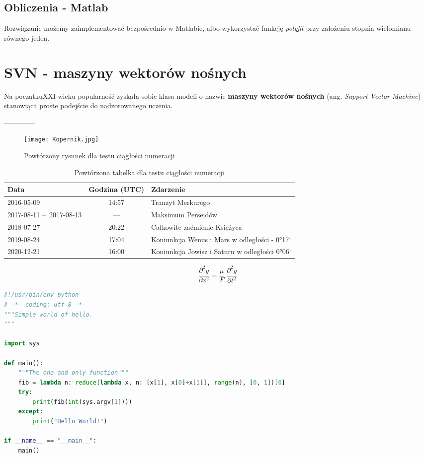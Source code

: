 \section{Obliczenia - Matlab} 
Rozwiązanie \cite{ossowski2023} możemy zaimplementować bezpośrednio w Matlabie, albo wykorzystać funkcję  \textit{ polyfit }  przy założeniu stopnia wielomianu równego jeden.




\chapter{ SVN - maszyny wektorów nośnych }
\cite{russell2023} Na początkuXXI wieku popularność zyskała sobie klasa modeli o nazwie \textbf{maszyny wektorów nośnych} (ang. \textit{Support Vector Machine}) stanowiąca proste podejście do nadzorowanego uczenia. 

 
--------------


\begin{figure}[!hb]
	\centering \texttt{[image: Kopernik.jpg]}
	\caption{Powtórzony rysunek dla testu ciągłości numeracji}
	\label{rys:kopernik2}
\end{figure}

\begin{table}[!b]
 \centering
  \begin{tabular}{p{2.5cm}c|l}
    Data        &   Godzina (UTC)   &   Zdarzenie\\\hline
    2016-05-09  &   14:57           &   Tranzyt Merkurego\\\hline
    2017-08-11 --~2017-08-13  & --- &   Maksimum Perseidów \\\hline
    2018-07-27  &   20:22           &   Całkowite zaćmienie Księżyca\\\hline
    2019-08-24  &   17:04           &   Koniunkcja Wenus i Mars w odległości - 0°17`\\\hline
    2020-12-21  &   16:00           &   Koniunkcja Jowisz i Saturn w odległości 0°06`
  \end{tabular}
 \caption{\label{tab:zjawiska2}Powtórzona tabelka dla testu ciągłości numeracji}
\end{table}

\begin{equation}
    \frac{\partial^2 y}{\partial x^2} = \frac{\mu}{F} \; \frac{\partial^2 y}{\partial t^2}
\end{equation}

\begin{lstlisting}[language=Python,
    caption={Powtórzony kod dla testu ciągłości numeracji},
    label={lst:hello2}]
#!/usr/bin/env python
# -*- coding: utf-8 -*-
"""Simple world of hello.
"""

import sys

def main():
    """The one and only function"""
    fib = lambda n: reduce(lambda x, n: [x[1], x[0]+x[1]], range(n), [0, 1])[0]
    try:
        print(fib(int(sys.argv[1])))
    except:
        print("Hello World!")

if __name__ == "__main__":
    main()
\end{lstlisting}


